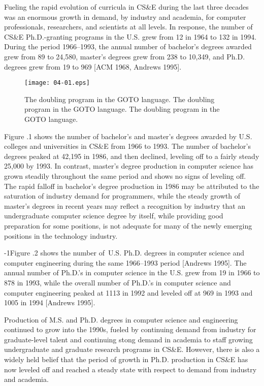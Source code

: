 Fueling the rapid evolution of curricula in CS\&E during the last
three decades was an enormous growth in demand, by industry and
academia, for computer professionals, researchers, and
scientists at all levels. In response, the number of CS\&E
Ph.D.-granting programs in the U.S. grew from 12 in 1964 to 132
in 1994. During the period 1966--1993, the annual number of
bachelor's degrees awarded grew from 89 to 24,580, master's
degrees grew from 238 to 10,349, and Ph.D. degrees grew from 19
to 969 [ACM 1968, Andrews 1995].

\begin{figure}
\centerline{\texttt{[image: 04-01.eps]}}
\caption{The doubling program in the GOTO language. The doubling program in the GOTO language. The doubling program in the GOTO language.}
\end{figure}


Figure {\thechapter}.1 shows the number of bachelor's and master's degrees
awarded by U.S. colleges and universities in CS\&E from 1966 to
1993. The number of bachelor's degrees peaked at 42,195
in 1986, and then declined, leveling off to a fairly steady
25,000 by 1993. In contrast, master's degree production in
computer science has grown steadily throughout the same period
and shows no signs of leveling off. The rapid falloff in
bachelor's degree production in 1986 may be attributed to the
saturation of industry demand for programmers, while the steady
growth of master's degrees in recent years may reflect a
recognition by industry that an undergraduate computer science
degree by itself, while providing good preparation for some
positions, is not adequate for many of the newly emerging
positions in the technology industry.



\looseness-1Figure {\thechapter}.2 shows the number of~U.S. Ph.D. degrees in computer
science and computer engineering during the same 1966--1993
period [Andrews 1995]. The annual number of Ph.D.'s in computer
science in the U.S. grew from 19 in 1966 to 878 in 1993, while
the overall number of Ph.D.'s in computer science and computer
engineering peaked at 1113 in 1992 and
leveled off at 969 in 1993 and 1005 in 1994 [Andrews 1995].

Production of M.S. and Ph.D. degrees in computer science and
engineering continued to grow into the 1990s, fueled by
continuing demand from industry for graduate-level talent and
continuing stong demand in academia to staff growing
undergraduate and graduate research programs in CS\&E. However,
there is also a widely held belief that the period of growth in
Ph.D. production in CS\&E has now leveled off and reached a steady
state with respect to demand from industry and academia.


